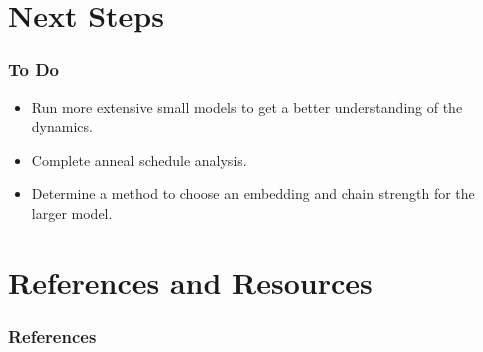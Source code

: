 \documentclass{beamer}
\begin{document}

\section{Next Steps}

\begin{frame}
    \frametitle{To Do}
    \begin{itemize}
        \item Run more extensive small models to get a better understanding of the dynamics.
        \item Complete anneal schedule analysis.
        \item Determine a method to choose an embedding and chain strength for the larger model.
    \end{itemize}
\end{frame}


\section{References and Resources}

\begin{frame}[allowframebreaks]
    \frametitle{References}
    \footnotesize{
        
        
    }
\end{frame}
\end{document}
